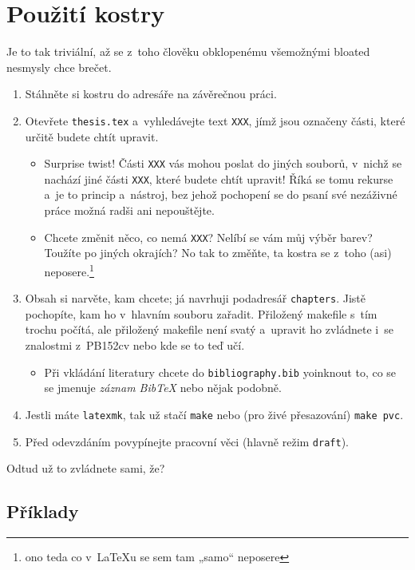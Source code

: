 \chapter{Použití kostry}

Je to tak triviální, až se z~toho člověku obklopenému všemožnými bloated
nesmysly chce brečet.

\begin{enumerate}
    \item Stáhněte si kostru do adresáře na závěrečnou práci.
    \item Otevřete \texttt{thesis.tex} a~vyhledávejte text \texttt{XXX}, jímž
    jsou označeny části, které určitě budete chtít upravit.
    \begin{itemize}
        \item Surprise twist! Části \texttt{XXX} vás mohou poslat do jiných
        souborů, v~nichž se nachází jiné části \texttt{XXX}, které budete chtít
        upravit! Říká se tomu rekurse a~je to princip a~nástroj, bez jehož
        pochopení se do psaní své nezáživné práce možná radši ani nepouštějte.
        \item Chcete změnit něco, co nemá \texttt{XXX}? Nelíbí se vám můj výběr
        barev? Toužíte po jiných okrajích? No tak to změňte, ta kostra se z~toho
        (asi) neposere.\footnote{ono teda co v~\LaTeX u se sem tam „samo“ neposere}
    \end{itemize}
    \item Obsah si narvěte, kam chcete; já navrhuji podadresář
    \texttt{chapters}. Jistě pochopíte, kam ho v~hlavním souboru zařadit.
    Přiložený makefile s~tím trochu počítá, ale přiložený makefile není svatý
    a~upravit ho zvládnete i~se znalostmi z~PB152cv nebo kde se to teď učí.
    \begin{itemize}
        \item Při vkládání literatury chcete do \texttt{bibliography.bib}
        yoinknout to, co se se jmenuje \emph{záznam BibTeX} nebo nějak podobně.
    \end{itemize}
    \item Jestli máte \texttt{latexmk}, tak už stačí \texttt{make} nebo (pro
    živé přesazování) \texttt{make pvc}.
    \item Před odevzdáním povypínejte pracovní věci (hlavně režim
    \texttt{draft}).
\end{enumerate}

Odtud už to zvládnete sami, že?

\section{Příklady}

